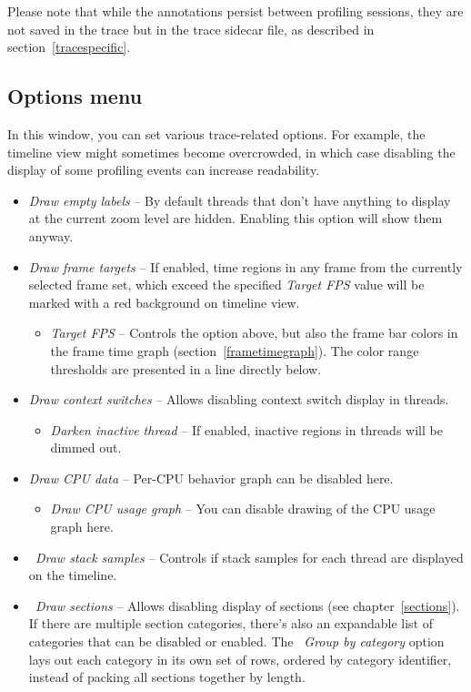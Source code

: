 \documentclass[hidelinks,titlepage,a4paper,twoside]{article}
\begin{document}
Please note that while the annotations persist between profiling sessions, they are not saved in the trace but in the trace sidecar file, as described in section~\ref{tracespecific}.

\subsection{Options menu}
\label{options}

In this window, you can set various trace-related options. For example, the timeline view might sometimes become overcrowded, in which case disabling the display of some profiling events can increase readability.

\begin{itemize}
\item \emph{\faExpand{} Draw empty labels} -- By default threads that don't have anything to display at the current zoom level are hidden. Enabling this option will show them anyway.
\item \emph{\faFlagCheckered{} Draw frame targets} -- If enabled, time regions in any frame from the currently selected frame set, which exceed the specified \emph{Target FPS} value will be marked with a red background on timeline view.
\begin{itemize}
\item \emph{Target FPS} -- Controls the option above, but also the frame bar colors in the frame time graph (section~\ref{frametimegraph}). The color range thresholds are presented in a line directly below.
\end{itemize}
\item \emph{\faPersonHiking{} Draw context switches} -- Allows disabling context switch display in threads.
\begin{itemize}
\item \emph{\faMoon{} Darken inactive thread} -- If enabled, inactive regions in threads will be dimmed out.
\end{itemize}
\item \emph{\faSliders{} Draw CPU data} -- Per-CPU behavior graph can be disabled here.
\begin{itemize}
\item \emph{\faSignature{} Draw CPU usage graph} -- You can disable drawing of the CPU usage graph here.
\end{itemize}
\item \emph{\faEyeDropper{}~Draw stack samples} -- Controls if stack samples for each thread are displayed on the timeline.
\item \emph{\faArrowsLeftRightToLine{}~Draw sections} -- Allows disabling display of sections (see chapter~\ref{sections}). If there are multiple section categories, there's also an expandable list of categories that can be disabled or enabled. The \emph{\faLayerGroup{}~Group by category} option lays out each category in its own set of rows, ordered by category identifier, instead of packing all sections together by length.

\end{itemize}
\end{document}

